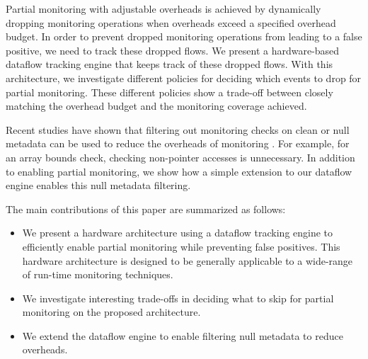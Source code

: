 Partial monitoring with adjustable overheads is achieved by dynamically
dropping monitoring operations when overheads exceed a specified overhead
budget.  In order to prevent dropped monitoring operations from leading to a
false positive, we need to track these dropped flows.  We present a
hardware-based dataflow tracking engine that keeps track of these dropped
flows. With this architecture, we investigate different policies for deciding
which events to drop for partial monitoring. These different policies show a
trade-off between closely matching the overhead budget and the monitoring
coverage achieved.

Recent studies have shown that filtering out monitoring checks on clean or null
metadata can be used to reduce the overheads of monitoring \cite{fade-hpca14}.
For example, for an array bounds check, checking non-pointer accesses is
unnecessary. In addition to enabling partial monitoring, we show how a simple
extension to our dataflow engine enables this null metadata filtering.

The main contributions of this paper are summarized as follows:
\begin{itemize}
  \item We present a hardware architecture using a dataflow tracking engine to
  efficiently enable partial monitoring while preventing false positives. This
  hardware architecture is designed to be generally applicable to a wide-range
  of run-time monitoring techniques.
  \item We investigate interesting trade-offs in deciding what to skip for
  partial monitoring on the proposed architecture.
  \item We extend the dataflow engine to enable filtering null metadata to
  reduce overheads.
\end{itemize}



